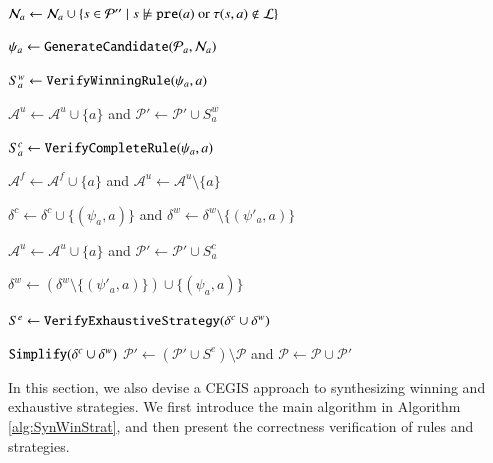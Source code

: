 \documentclass[review]{elsarticle}
\newcommand{\nmodels}{\mathrel{\ooalign{$\models$\cr\hfil$/$\hfil\cr}}}
\newcommand{\set}[1]{\{ #1 \}}
\newcommand{\true}{\top}
\newcommand{\false}{\bot}
\newcommand{\positiveSet}{\mathcal{P}}
\newcommand{\negativeSet}{\mathcal{N}}
\newcommand{\loseSet}{\mathcal{L}}
\newcommand{\act}{\mathcal{A}}
\newcommand{\constraint}{\mathcal{C}}
\newcommand{\pre}{\mathtt{pre}}
\newcommand{\suc}{\tau}
\newcommand{\assign}{\leftarrow}
\begin{document}
\begin{algorithm}[htbp]
{{{				$\negativeSet_a \assign \negativeSet_a \cup \set{s  \in \positiveSet'' \mid s \nmodels \pre(a) \text{ or } \suc(s, a) \notin \loseSet}$
			\vspace*{-1mm}}
			
			$\psi_a \assign {\tt GenerateCandidate}(\positiveSet_a, \negativeSet_a)$
						
			
			$S^w_a \assign {\tt VerifyWinningRule}(\psi_a, a)$
			
			{
				$\act^u \assign \act^u \cup \set{a}$ and $\positiveSet' \assign \positiveSet' \cup S^w_a$
			}
			{
				$S^c_a \assign {\tt VerifyCompleteRule}(\psi_a, a)$
				
				{					
					$\act^f \assign \act^f \cup \set{a}$ and $\act^u \assign \act^u \setminus \set{a}$
					
					$\delta^c \assign \delta^c \cup \set{(\psi_a, a)}$ and $\delta^w \assign \delta^w \setminus \set{(\psi'_a, a)}$ 
					\vspace*{-1mm}}
				\Else
				{
					$\act^u \assign \act^u \cup \set{a}$ and $\positiveSet' \assign \positiveSet' \cup S^c_a$
					
					$\delta^w \assign (\delta^w \setminus \set{(\psi'_a, a)}) \cup \set{(\psi_a, a)}$ 
				}				
			\vspace*{-1mm}}
		\vspace*{-1mm}}
				
		
		
		$S^e \assign {\tt VerifyExhaustiveStrategy}(\delta^c \cup \delta^w)$ %
		
		{	
			\Return ${\tt Simplify}(\delta^c \cup \delta^w)$
		}
		\lElse
		{
			$\positiveSet' \assign (\positiveSet' \cup S^e) \setminus \positiveSet$ and	$\positiveSet \assign \positiveSet \cup \positiveSet'$
		}
	}
\end{algorithm}


In this section, we also devise a CEGIS approach to synthesizing winning and exhaustive strategies.
We first introduce the main algorithm in Algorithm \ref{alg:SynWinStrat}, and then present the correctness verification of rules and strategies.
\end{document}
